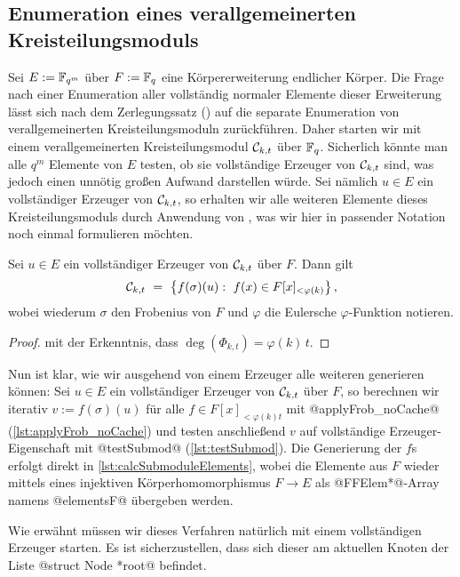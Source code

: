 \subsection{Enumeration eines verallgemeinerten Kreisteilungsmoduls}

Sei $E := \mathbb{F}_{q^m}$ über $F := \mathbb{F}_q$ eine Körpererweiterung endlicher Körper. Die Frage
nach einer Enumeration aller vollständig normaler Elemente dieser Erweiterung
lässt sich nach dem Zerlegungssatz () auf die
separate Enumeration von verallgemeinerten Kreisteilungsmoduln zurückführen.
Daher starten wir mit einem verallgemeinerten Kreisteilungsmodul $\mathcal{C}_{k,t}$
über $\mathbb{F}_q$. Sicherlich könnte man alle $q^m$ Elemente von $E$ testen, ob sie
vollständige Erzeuger von $\mathcal{C}_{k,t}$ sind, was jedoch einen unnötig großen
Aufwand darstellen würde. Sei nämlich $u\in E$ ein vollständiger Erzeuger von
$\mathcal{C}_{k,t}$, so erhalten wir alle weiteren Elemente dieses Kreisteilungsmoduls
durch Anwendung von , was wir hier in passender
Notation noch einmal formulieren möchten.

\begin{lemma}
  \label{lemma:moduln_durch_polys}
  Sei $u\in E$ ein vollständiger Erzeuger von $\mathcal{C}_{k,t}$ über $F$. 
  Dann gilt
  \[ \mathcal{C}_{k,t} \ =\  \big\{ f(\sigma)(u):\ f(x) \in F[x]_{<\varphi(k)}\big\} \,,\]
  wobei wiederum $\sigma$ den Frobenius von $F$ und 
  $\varphi$ die Eulersche $\varphi$-Funktion notieren.
\end{lemma}
\begin{proof}
   mit der Erkenntnis, dass
  $\deg(\Phi_{k,t}) = \varphi(k)\,t$.
\end{proof}

Nun ist klar, wie wir ausgehend von einem Erzeuger alle weiteren generieren
können: Sei $u \in E$ ein vollständiger Erzeuger von $\mathcal{C}_{k,t}$ über $F$, so 
berechnen wir iterativ $v := f(\sigma)(u)$ für alle $f \in F[x]_{<\varphi(k)t}$
mit @applyFrob_noCache@ (\autoref{lst:applyFrob_noCache}) 
und testen anschließend $v$ auf vollständige Erzeuger-Eigenschaft mit 
@testSubmod@ (\autoref{lst:testSubmod}). 
Die Generierung der $f$s erfolgt direkt in \autoref{lst:calcSubmoduleElements},
wobei die Elemente aus $F$ wieder mittels eines injektiven Körperhomomorphismus 
$F\to E$ als @FFElem*@-Array namens @elementsF@ übergeben werden.

Wie erwähnt müssen wir dieses Verfahren natürlich mit einem vollständigen
Erzeuger starten. Es ist sicherzustellen, dass sich dieser am aktuellen Knoten 
der Liste @struct Node *root@ befindet.

